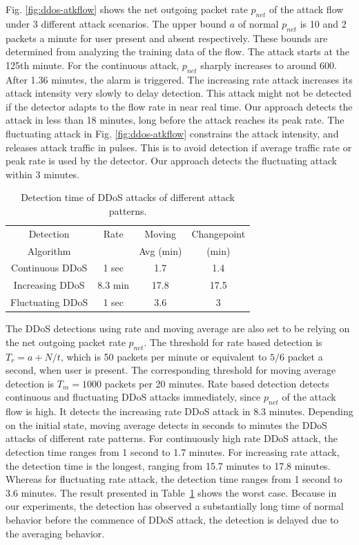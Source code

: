 Fig. \ref{fig:ddos-atkflow} shows the net outgoing packet rate
$p_{net}$ of the attack flow under 3 different attack scenarios. The
upper bound $a$ of normal $p_{net}$ is 10 and 2 packets a minute for
user present and absent respectively. These bounds are determined
from analyzing the training data of the flow. The attack starts at
the 125th minute. For the continuous attack, $p_{net}$ sharply
increases to around 600. After 1.36 minutes, the alarm is triggered.
The increasing rate attack increases its attack intensity very
slowly to delay detection. This attack might not be detected if the
detector adapts to the flow rate in near real time. Our approach
detects the attack in less than 18 minutes, long before the attack
reaches its peak rate. The fluctuating attack in Fig. \ref{fig:ddos-atkflow}
constrains the attack intensity, and releases attack traffic in
pulses. This is to avoid detection if average traffic rate or peak
rate is used by the detector. Our approach detects the fluctuating
attack within 3 minutes.

\begin{table}[!t]
  \centering
  \begin{tabular}{|c|c|c|c|}
  \hline
  Detection & Rate & Moving & Changepoint \\
  Algorithm & & Avg (min) & (min) \\
  \hline
  Continuous DDoS  & 1 sec & 1.7  & 1.4   \\
  \hline
  Increasing DDoS & 8.3 min & 17.8  & 17.5   \\
  \hline
  Fluctuating DDoS & 1 sec &  3.6  & 3   \\ [0.5ex]
  \hline
  \end{tabular}
  \caption{Detection time of DDoS attacks of different attack patterns.}
  \label{tbl:detect-DDoS}
\end{table}

The DDoS detections using rate and moving average are also set to be relying on the net outgoing packet rate $p_{net}$. The threshold for rate based detection is $T_r = a + N/t$, which is 50 packets per minute or equivalent to $5/6$ packet a second, when user is present. The corresponding threshold for moving average detection is $T_m = 1000$ packets per 20 minutes.
Rate based detection detects continuous and fluctuating DDoS attacks immediately, since $p_{net}$ of the attack flow is high. It detects the increasing rate DDoS attack in 8.3 minutes. 
Depending on the initial state, moving average detects in seconds to minutes the DDoS attacks of different rate patterns. For continuously high rate DDoS attack, the detection time ranges from 1 second to 1.7 minutes. For increasing rate attack, the detection time is the longest, ranging from 15.7 minutes to 17.8 minutes. Whereas for fluctuating rate attack, the detection time ranges from 1 second to 3.6 minutes. The result presented in Table~\ref{tbl:detect-DDoS} shows the worst case. Because in our experiments, the detection has observed a substantially long time of normal behavior before the commence of DDoS attack, the detection is delayed due to the averaging behavior.

